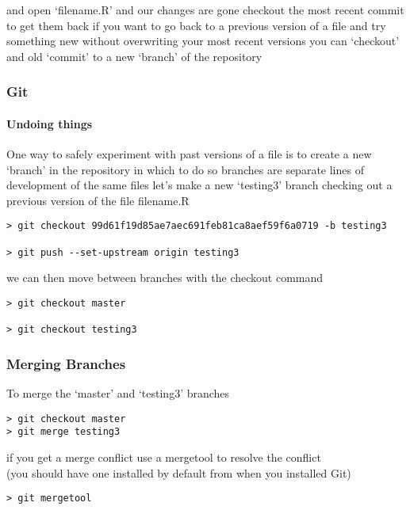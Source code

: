 \documentclass[xcolor=dvipsnames]{beamer}
\begin{document}
\begin{frame}
\newline
\newline
and open `filename.R' and our changes are gone
\newline
\newline
checkout the most recent commit to get them back
\newline
\newline
if you want to go back to a previous version of a file and try something new without overwriting your most recent versions you can `checkout' and old `commit' to a new `branch' of the repository

\end{frame}



\begin{frame}[fragile]
\frametitle{Git}
\framesubtitle{Undoing things}
One way to safely experiment with past versions of a file is to create a new `branch' in the repository in which to do so
\newline
\newline
branches are separate lines of development of the same files
\newline
\newline
let's make a new `testing3' branch checking out a previous version of the file filename.R\\
\begin{lstlisting}
> git checkout 99d61f19d85ae7aec691feb81ca8aef59f6a0719 -b testing3

> git push --set-upstream origin testing3
\end{lstlisting}
we can then move between branches with the checkout command
\begin{lstlisting}
> git checkout master

> git checkout testing3
\end{lstlisting}
\end{frame}

\begin{frame}[fragile]
  \frametitle{Merging Branches}
To merge the `master' and `testing3' branches
\begin{block}{}
\begin{lstlisting}
> git checkout master
> git merge testing3
\end{lstlisting}
\end{block}

if you get a merge conflict use a mergetool to resolve the conflict\\
(you should have one installed by default from when you installed Git)

\begin{block}{}
\begin{lstlisting}
> git mergetool
\end{lstlisting}
\end{block}
\end{frame}
\end{document}
